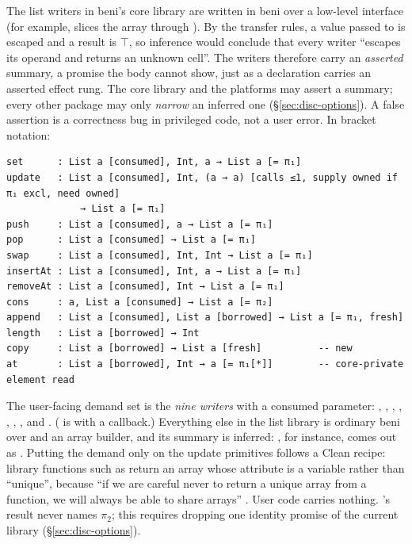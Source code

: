 The list writers in beni's core library are written in beni over a low-level  interface
(for example,  slices the array through ). By the transfer rules, a value
passed to  is escaped and a  result is $\top$, so inference would conclude that every
writer ``escapes its operand and returns an unknown cell''. The writers therefore carry an
\emph{asserted} summary, a promise the body cannot show, just as a  declaration carries
an asserted effect rung. The core library and the platforms may assert a summary; every other
package may only \emph{narrow} an inferred one (\S\ref{sec:disc-options}). A false assertion is a
correctness bug in privileged code, not a user error. In bracket notation:
\begin{Verbatim}
set      : List a [consumed], Int, a → List a [= π₁]
update   : List a [consumed], Int, (a → a) [calls ≤1, supply owned if π₁ excl, need owned]
             → List a [= π₁]
push     : List a [consumed], a → List a [= π₁]
pop      : List a [consumed] → List a [= π₁]
swap     : List a [consumed], Int, Int → List a [= π₁]
insertAt : List a [consumed], Int, a → List a [= π₁]
removeAt : List a [consumed], Int → List a [= π₁]
cons     : a, List a [consumed] → List a [= π₂]
append   : List a [consumed], List a [borrowed] → List a [= π₁, fresh]
length   : List a [borrowed] → Int
copy     : List a [borrowed] → List a [fresh]          -- new
at       : List a [borrowed], Int → a [= π₁[*]]        -- core-private element read
\end{Verbatim}
The user-facing demand set is the \emph{nine writers} with a consumed parameter: ,
, , , , , ,  and
. ( is  with a callback.) Everything else in the list library is
ordinary beni over  and an array builder, and its summary is inferred: , for
instance, comes out as
. Putting
the demand only on the update primitives follows a Clean recipe: library functions such as
 return an array whose attribute is a variable rather than ``unique'', because ``if
we are careful never to return a unique array from a function, we will always be able to share
arrays'' \citep[\S6]{devries2008simplified}. User code carries nothing. 's result never names
$\pi_2$; this requires dropping one identity promise of the current library (\S\ref{sec:disc-options}).

